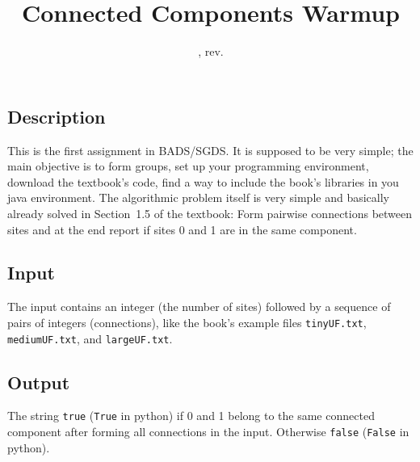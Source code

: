 \documentclass{tufte-handout}
\title{Connected Components Warmup}
\date{\GITAuthorDate, rev. \GITAbrHash}
\author{}
\begin{document}
\maketitle

\subsection{Description}

This is the first assignment in BADS/SGDS. 
It is supposed to be very simple; the main objective is to form groups, set up your programming environment, download the textbook's code, find a way to include the book's libraries in you java environment.
The algorithmic problem itself is very simple and basically already solved in Section~1.5 of the textbook:
Form pairwise connections between sites and at the end report if sites 0 and 1 are in the same component.

\subsection{Input}

The input contains an integer (the number of sites) followed by a sequence of pairs of integers (connections), like the book's example files {\tt tinyUF.txt}, {\tt mediumUF.txt}, and {\tt largeUF.txt}.


\subsection{Output}

The string {\tt true} ({\tt True} in python) if 0 and 1 belong to the same connected component after forming all connections in the input. 
Otherwise {\tt false}  ({\tt False} in python).
\end{document}
